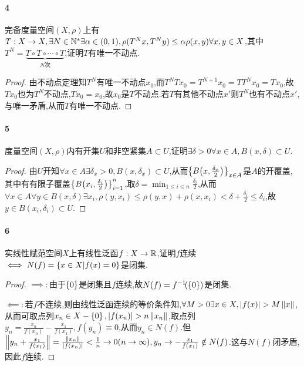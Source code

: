 \documentclass{article}
\begin{document}
\paragraph{4}完备度量空间$(X,\rho)$上有$T:X\to X, \exists N\in \mathbb{N}^*\exists \alpha\in (0,1), \rho(T^N x,T^N y)\leq \alpha\rho(x,y)\forall x,y\in X$,其中$T^N=\underbrace{T\circ T\circ\cdots\circ T}_{N次}$,证明$T$有唯一不动点.
\begin{proof}
    由不动点定理知$T^N$有唯一不动点$x_0$,而$T^N T x_0=T^{N+1}x_0=T T^N x_0=T x_0$,故$T x_0$也为$T^N$不动点,$T x_0=x_0$,故$x_0$是$T$不动点.若$T$有其他不动点$x'$则$T^N$也有不动点$x'$,与唯一矛盾,从而$T$有唯一不动点.
\end{proof}

\paragraph{5}度量空间$(X,\rho)$内有开集$U$和非空紧集$A\subset U$,证明$\exists \delta>0\forall x\in A, B(x,\delta)\subset U$.
\begin{proof}
    由$U$开知$\forall x\in A\exists\delta_x>0, B(x,\delta_x)\subset U$,从而$\left\{B\!\left(x,\frac{\delta_x}{2}\right)\right\}_{x\in A}$是$A$的开覆盖,其中有有限子覆盖$\left\{B\!\left(x_i,\frac{\delta_i}{2}\right)\right\}_{i=1}^n$,取$\delta=\min_{1\leq i\leq n}\frac{\delta_i}{2}$,从而$\forall x\in A\forall y\in B(x,\delta)\exists x_i, \rho(y,x_i)\leq \rho(y,x)+\rho(x,x_i)<\delta+\frac{\delta_i}{2}\leq \delta_i$,故$y\in B(x_i,\delta_i)\subset U$.
\end{proof}

\paragraph{6}实线性赋范空间$X$上有线性泛函$f:X\to\mathbb{R}$,证明$f$连续$\iff N(f)=\left\{x\in X|f(x)=0\right\}$是闭集.
\begin{proof}
    $\implies:$由于$\left\{0\right\}$是闭集且$f$连续,故$N(f)=f^{-1}\!(\left\{0\right\})$是闭集.

    $\impliedby:$若$f$不连续,则由线性泛函连续的等价条件知,$\forall M>0\exists x\in X, \abs{f(x)}>M\norm{x}$,从而可取点列$x_n\in X-\cbr{0}, \abs{f(x_n)}>n\norm{x_n}$,取点列$y_n=\frac{x_n}{f(x_n)}-\frac{x_1}{f(x_1)}, f(y_n)\equiv 0$,从而$y_n\in N(f)$.但$\left\|y_n+\frac{x_1}{f(x_1)}\right\|=\frac{\left\|x_n\right\|}{\left|f(x_n)\right|}<\frac{1}{n}\to 0(n\to\infty), y_n\to -\frac{x_1}{f(x_1)}\notin N(f)$.这与$N(f)$闭矛盾,因此$f$连续.
\end{proof}
\end{document}
